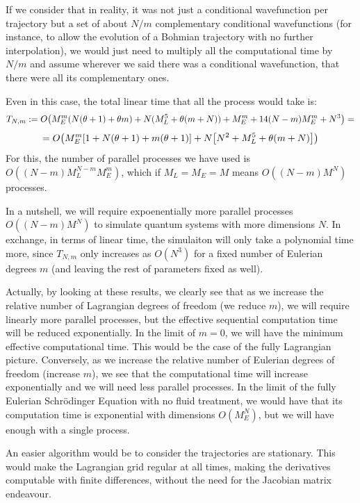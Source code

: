 \documentclass[11pt, a4paper]{article} %
\begin{document}
If we consider that in reality, it was not just a conditional wavefunction per trajectory but a set of about $N/m$ complementary conditional wavefunctions (for instance, to allow the evolution of a Bohmian trajectory with no further interpolation), we would just need to multiply all the computational time by $N/m$ and assume wherever we said there was a conditional wavefunction, that there were all its complementary ones.

Even in this case, the total linear time that all the process would take is:
\begin{equation}
T_{N,m}:=O\qty(M_E^m(N(\theta+1)+\theta m)+N(M_L^5+\theta(m+N))+M_E^m+14(N-m)M_E^m+N^3)=
\end{equation}
$$
=O\qty(M_E^m\qty[1+N(\theta+1)+m(\theta+1)]+N\qty[N^2+M_L^5+\theta(m+N) ])
$$
For this, the number of parallel processes we have used is $O((N-m)M_L^{N-m}M_E^{m})$, which if $M_L=M_E=M$ means $O((N-m)M^{N})$ processes.

In a nutshell, we will require expoenentially more parallel processes $O((N-m)M^{N})$ to simulate quantum systems with more dimensions $N$. In exchange, in terms of linear time, the simulaiton will only take a polynomial time more, since $T_{N,m}$ only increases as $O(N^3)$ for a fixed number of Eulerian degrees $m$ (and leaving the rest of parameters fixed as well).

Actually, by looking at these results, we clearly see that as we increase the relative number of Lagrangian degrees of freedom (we reduce $m$), we will require linearly more parallel processes, but the effective sequential computation time will be reduced exponentially. In the limit of $m=0$, we will have the minimum effective computational time. This would be the case of the fully Lagrangian picture. Conversely, as we increase the relative number of Eulerian degrees of freedom (increase $m$), we see that the computational time will increase exponentially and we will need less parallel processes. In the limit of the fully Eulerian Schrödinger Equation with no fluid treatment, we would have that its computation time is exponential with dimensions $O(M_E^N)$, but we will have enough with a single process.

An easier algorithm would be to consider the trajectories are stationary. This would make the Lagrangian grid regular at all times, making the derivatives computable with finite differences, without the need for the Jacobian matrix endeavour.
\end{document}
